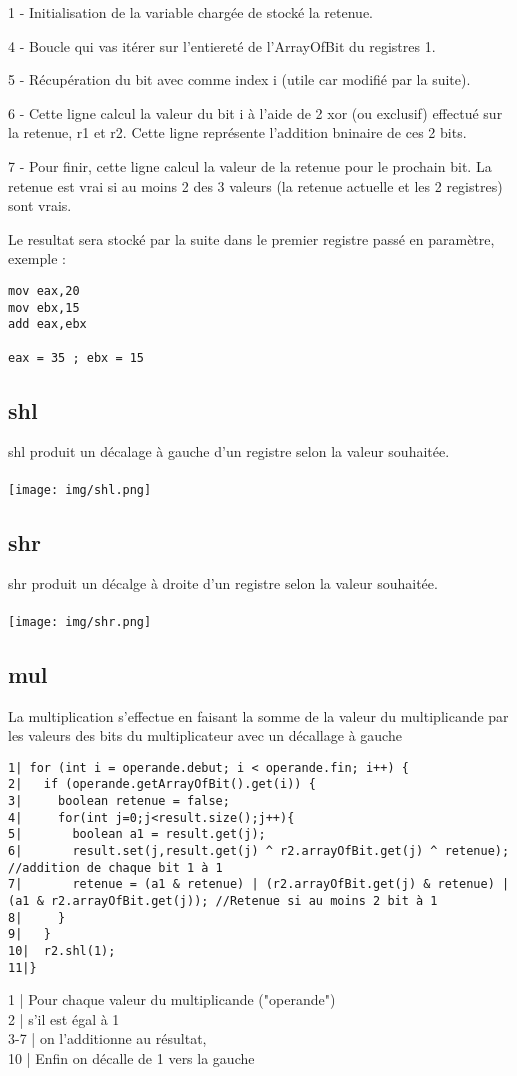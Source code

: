 \documentclass{article}
\begin{document}
1 - Initialisation de la variable chargée de stocké la retenue.

4 - Boucle qui vas itérer sur l'entiereté de l'ArrayOfBit du registres 1.

5 - Récupération du bit avec comme index i (utile car modifié par la suite).

6 - Cette ligne calcul la valeur du bit i à l'aide de 2 xor (ou exclusif) effectué sur la retenue, r1 et r2. Cette ligne représente l'addition bninaire de ces 2 bits.

7 - Pour finir, cette ligne calcul la valeur de la retenue pour le prochain bit. La retenue est vrai si au moins 2 des 3 valeurs (la retenue actuelle et les 2 registres) sont vrais.

Le resultat sera stocké par la suite dans le premier registre passé en paramètre, exemple :
\begin{verbatim}
mov eax,20
mov ebx,15
add eax,ebx

eax = 35 ; ebx = 15
\end{verbatim}

\newpage
\subsection{shl}
shl produit un décalage à gauche d'un registre selon la valeur souhaitée.
\\
\\
\texttt{[image: img/shl.png]}

\subsection{shr}
shr produit un décalge à droite d'un registre selon la valeur souhaitée.
\\
\\
\texttt{[image: img/shr.png]}
\newpage
\subsection{mul}
La multiplication s'effectue en faisant la somme de la valeur du multiplicande par les valeurs des bits du multiplicateur avec un décallage à gauche
\begin{verbatim}
1| for (int i = operande.debut; i < operande.fin; i++) {
2|   if (operande.getArrayOfBit().get(i)) {
3|     boolean retenue = false;
4|     for(int j=0;j<result.size();j++){
5|       boolean a1 = result.get(j);
6|       result.set(j,result.get(j) ^ r2.arrayOfBit.get(j) ^ retenue); //addition de chaque bit 1 à 1
7|       retenue = (a1 & retenue) | (r2.arrayOfBit.get(j) & retenue) | (a1 & r2.arrayOfBit.get(j)); //Retenue si au moins 2 bit à 1
8|     }
9|   }
10|  r2.shl(1);
11|}
\end{verbatim}
1 | Pour chaque valeur du multiplicande ("operande")\\
2 | s'il est égal à 1\\
3-7 | on l'additionne au résultat,\\
10 | Enfin on décalle de 1 vers la gauche\\
\end{document}
